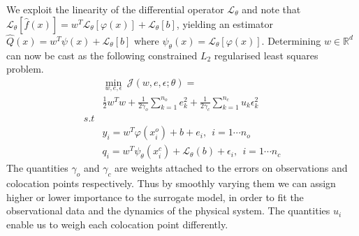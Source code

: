We exploit the linearity of the differential operator $\mathcal{L}_{\theta}$ and note that 
$\mathcal{L}_{\theta} [\hat{f}(x)] = w^{T} \mathcal{L}_{\theta}[\varphi(x)] + \mathcal{L}_{\theta}[b]$, 
yielding an estimator 
$\hat{Q}(x) = w^{T}\psi(x) + \mathcal{L}_{\theta}[b]$ where $\psi_{\theta}(x) = \mathcal{L}_{\theta}[\varphi(x)]$. 
Determining $w \in \mathbb{R}^d$ can now be cast as the following constrained $L_2$ regularised 
least squares problem.
%
\begin{equation}\label{eq:surrogate}
   \begin{aligned}
    & \min_{w,e,\epsilon} \ \mathcal{J}(w,e,\epsilon;\theta) = \\
    & \frac{1}{2} w^{T}w + \frac{1}{2\gamma_{o}} \sum_{k = 1}^{n_{o}}{e^{2}_{k}} + 
      \frac{1}{2\gamma_{c}} \sum_{k = 1}^{n_{c}}{u_{k} \epsilon^{2}_{k}} \\
    s.t & \\
    & y_{i}  = w^{T}\varphi(x^{o}_{i}) + b + e_{i}, \ \ i = 1 \cdots n_{o} \\
    & q_{i} = w^{T}\psi_{\theta}(x^{c}_{i}) + \mathcal{L}_{\theta}(b) + \epsilon_{i}, \ \ i = 1 \cdots n_{c}
   \end{aligned}
\end{equation}
%
The quantities $\gamma_{o}$ and $\gamma_{c}$ are weights attached to the errors on observations and 
colocation points respectively. Thus by smoothly varying them we can assign higher or lower 
importance to the surrogate model, in order to fit the observational data and the dynamics of the 
physical system. The quantities $u_i$ enable us to weigh each colocation point differently. 

